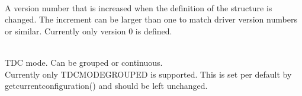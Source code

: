 			\\
			A version number that is increased when the definition of the structure is changed. The increment can be larger than one to match driver version numbers or similar. Currently only version 0 is defined.\par

			\\
			TDC mode. Can be grouped or continuous. \\
			Currently only \PREFIX TDC\tu MODE\tu GROUPED is supported. 
			This is set per default by \textsf{\prefix get\tu current\tu configuration()} and should be left unchanged.\par

			\par

